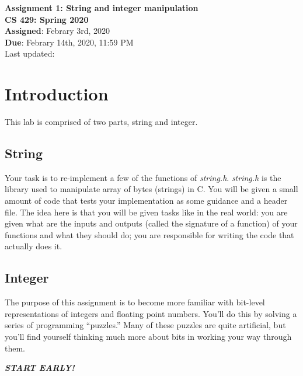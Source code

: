 \documentclass[11pt]{article}
\begin{document}
\pagestyle{myheadings}
\thispagestyle{empty}
\vspace*{-1.5in}
\begin{center}

\LARGE{\bf Assignment 1: String and integer manipulation}\\
\Large\textbf{CS 429: Spring 2020} \\
\large \textbf{Assigned}: Febrary 3rd, 2020 \\
\large \textbf{Due}: Febrary 14th, 2020, 11:59 PM \\ \normalsize
Last updated: \printtime

\end{center}



\section{Introduction}

This lab is comprised of two parts, string and integer.

\subsection{String}

Your task is to re-implement a few of the functions of \textit{string.h}. \textit{string.h} is the library used to manipulate array of bytes (strings) in C. You will be given a small amount of code that tests
your implementation as some guidance and a header file. The idea here is that you will be given tasks like in the real
world: you are given what are the inputs and outputs (called the signature of a function) of your functions and
what they should do; you are responsible for writing the code
that actually does it.

\subsection{Integer}

The purpose of this assignment is to become more familiar with
bit-level representations of integers and floating point numbers.
You'll do this by solving a series of programming ``puzzles.'' Many of
these puzzles are quite artificial, but you'll find yourself thinking
much more about bits in working your way through them.


\begin{center}\LARGE\bfseries\itshape
START EARLY!
\end{center}
\end{document}
